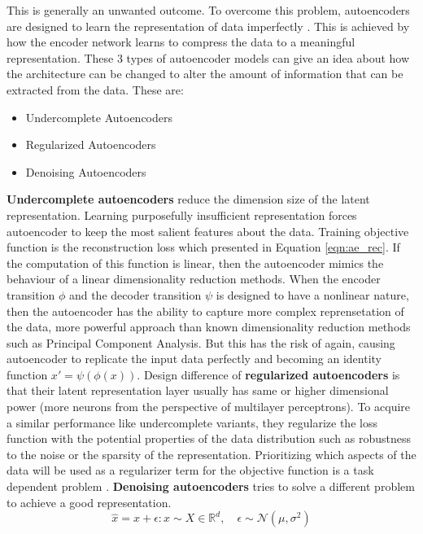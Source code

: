 This is generally an unwanted outcome. To overcome this problem, autoencoders are designed to learn the
representation of data imperfectly \cite{Goodfellow-et-al-2016}. This is achieved by how the
encoder network learns to compress the data to a meaningful representation. These 3 types of
autoencoder models can give an idea about how the architecture can be changed to alter the amount of
information that can be extracted from the data. These are:

\begin{itemize}
    \item Undercomplete Autoencoders
    \item Regularized Autoencoders
    \item Denoising Autoencoders
\end{itemize}

\textbf{Undercomplete autoencoders} reduce the dimension size of the latent representation. Learning
purposefully insufficient representation forces autoencoder to keep the most salient features about
the data. Training objective function is the reconstruction loss which presented in Equation
\ref{eqn:ae_rec}. If the computation of this function is linear, then the autoencoder mimics the
behaviour of a linear dimensionality reduction methods. When the encoder transition $\phi$ and the
decoder transition $\psi$ is designed to have a nonlinear nature, then the autoencoder has the
ability to capture more complex reprensetation of the data, more powerful approach than known dimensionality 
reduction methods such as Principal Component Analysis. But this has the risk of again, causing 
autoencoder to replicate the input data perfectly and becoming an identity function $x' = \psi(\phi(x))$. 
 Design difference of \textbf{regularized autoencoders} is that their latent representation layer usually has same 
or higher dimensional power (more neurons from the perspective of multilayer perceptrons). 
To acquire a similar performance like undercomplete variants, they regularize the loss function  
with the potential properties of the data distribution such as robustness to the noise or the 
sparsity of the representation. Prioritizing which aspects of the data will be used as a regularizer 
term for the objective function is a task dependent problem \cite{Goodfellow-et-al-2016}. 
\textbf{Denoising autoencoders} tries to solve a different problem to achieve a good representation. 
$$
\hat{x} = x + \epsilon : x \sim X \in \mathbb{R}^d ,\quad \epsilon \sim \mathcal{N}(\mu, \sigma^2)
$$

